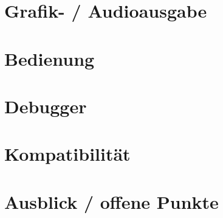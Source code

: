 \documentclass[a4paper]{scrartcl}
\begin{document}
\section{Grafik- / Audioausgabe}
\section{Bedienung}
\section{Debugger}
\section{Kompatibilität}
\section{Ausblick / offene Punkte}
\end{document}
